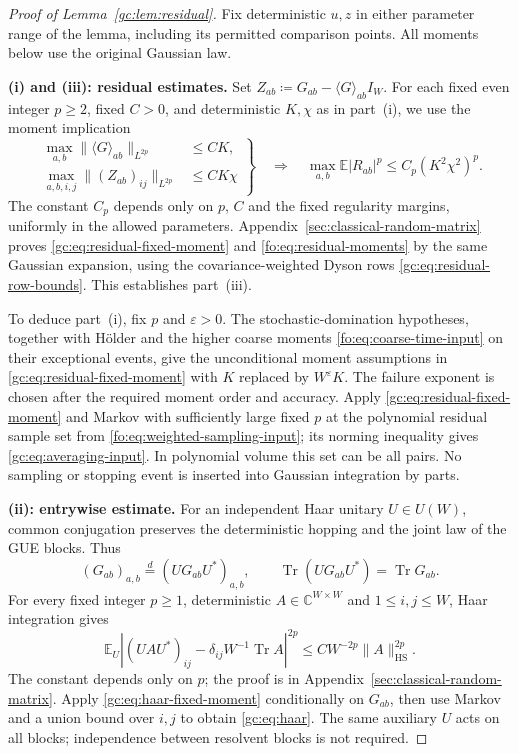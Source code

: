 \documentclass[11pt]{article}
\numberwithin{equation}{section}
\theoremstyle{remark}
\newcommand{\E}{\mathbb E}
\newcommand{\C}{\mathbb C}
\newcommand{\Tr}{\operatorname{Tr}}
\newcommand{\HS}{\mathrm{HS}}
\begin{document}
\begin{proof}[Proof of Lemma~\ref{gc:lem:residual}]
Fix deterministic $u,z$ in either parameter range of the lemma,
including its permitted comparison points. All moments below use the
original Gaussian law.

\medskip
\noindent\textbf{(i) and (iii): residual estimates.}
Set $Z_{ab}\coloneqq G_{ab}-\langle G\rangle_{ab}I_W$.
For each fixed even integer $p\ge2$, fixed $C>0$, and deterministic
$K,\chi$ as in part~(i), we use the moment implication
\begin{equation}\label{gc:eq:residual-fixed-moment}
 \left.
 \begin{aligned}
 \max_{a,b}\|\langle G\rangle_{ab}\|_{L^{2p}}&\le CK,\\
 \max_{a,b,i,j}\|(Z_{ab})_{ij}\|_{L^{2p}}&\le CK\chi
 \end{aligned}\right\}
 \quad\Longrightarrow\quad
 \max_{a,b}\E|R_{ab}|^p\le C_p(K^2\chi^2)^p.
\end{equation}
The constant $C_p$ depends only on $p$, $C$ and the fixed regularity
margins, uniformly in the allowed parameters.
Appendix~\ref{sec:classical-random-matrix} proves
\eqref{gc:eq:residual-fixed-moment} and \eqref{fo:eq:residual-moments}
by the same Gaussian expansion, using the covariance-weighted Dyson
rows \eqref{gc:eq:residual-row-bounds}. This establishes part~(iii).

To deduce part~(i), fix $p$ and $\varepsilon>0$.
The stochastic-domination hypotheses, together with H\"older and the
higher coarse moments \eqref{fo:eq:coarse-time-input} on their exceptional
events, give the unconditional moment assumptions in
\eqref{gc:eq:residual-fixed-moment} with $K$ replaced by
$W^\varepsilon K$. The failure exponent is chosen after the required
moment order and accuracy. Apply \eqref{gc:eq:residual-fixed-moment}
and Markov with sufficiently large fixed $p$ at the polynomial residual
sample set from \eqref{fo:eq:weighted-sampling-input}; its norming
inequality gives \eqref{gc:eq:averaging-input}. In polynomial volume
this set can be all pairs. No sampling or stopping event is inserted
into Gaussian integration by parts.

\medskip
\noindent\textbf{(ii): entrywise estimate.}
For an independent Haar unitary $U\in U(W)$, common conjugation preserves
the deterministic hopping and the joint law of the GUE blocks. Thus
\[
 (G_{ab})_{a,b}\stackrel d=(UG_{ab}U^*)_{a,b},
 \qquad \Tr(UG_{ab}U^*)=\Tr G_{ab}.
\]
For every fixed integer $p\ge1$, deterministic
$A\in\C^{W\times W}$ and $1\le i,j\le W$, Haar integration gives
\begin{equation}\label{gc:eq:haar-fixed-moment}
 \E_U\left|(UAU^*)_{ij}-\delta_{ij}W^{-1} \Tr A\right|^{2p}
       \le CW^{-2p}\|A\|_{\HS}^{2p}.
\end{equation}
The constant depends only on $p$; the proof is in
Appendix~\ref{sec:classical-random-matrix}.
Apply \eqref{gc:eq:haar-fixed-moment} conditionally on $G_{ab}$,
then use Markov and a union bound over $i,j$ to obtain
\eqref{gc:eq:haar}. The same auxiliary $U$ acts on all blocks;
independence between resolvent blocks is not required.
\end{proof}
\end{document}
